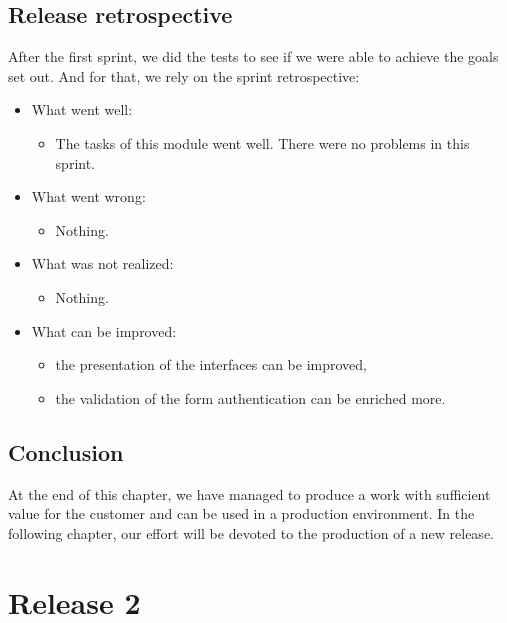 \documentclass[12pt,a4paper]{report}
\begin{document}
\section{Release retrospective}
	After the first sprint, we did the tests to see if
	we were able to achieve the goals set out. And for that, we rely on the
	sprint retrospective:\\
	\begin{itemize}
		\item	What went well:
	\begin{itemize}
		\item The tasks of this module went well. There were no problems
		in this sprint.
	\end{itemize}
\end{itemize}
\begin{itemize}
	\item	What went wrong:
	\begin{itemize}
		\item Nothing.
	\end{itemize}
\end{itemize}
\begin{itemize}
	\item	What was not realized:
	\begin{itemize}
		\item Nothing.
	\end{itemize}
\end{itemize}
	\begin{itemize}
	\item	What can be improved:
	\begin{itemize}
		\item the presentation of the interfaces can be improved,
		\item the validation of the form authentication can be enriched more.
	\end{itemize}
	\end{itemize}
 
	\section*{Conclusion}
	At the end of this chapter, we have managed to produce a work with sufficient value for the customer and can be used in a production environment. In the following chapter, our effort will be devoted to the production of a new release.
	\chapter{Release 2}
\end{document}
